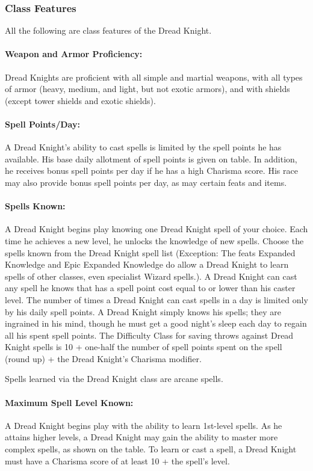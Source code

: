 \subsubsection{Class Features}
All the following are class features of the Dread Knight.

\paragraph{Weapon and Armor Proficiency:} 
Dread Knights are proficient with all simple and martial weapons, 
with all types of armor (heavy, medium, and light, but not exotic armors),
and with shields (except tower shields and exotic shields).

\paragraph{Spell Points/Day:} A Dread Knight's ability to cast spells is limited by the spell points he has available. 
His base daily allotment of spell points is given on  table. 
In addition, he receives bonus spell points per day if he has a high Charisma score.
His race may also provide bonus spell points per day, as may certain feats and items.

\paragraph{Spells Known:} A Dread Knight begins play knowing one Dread Knight spell of your choice. 
Each time he achieves a new level, he unlocks the knowledge of new spells.
Choose the spells known from the Dread Knight spell list
(Exception: The feats Expanded Knowledge and Epic Expanded Knowledge do allow a Dread Knight to learn spells of other classes, even specialist Wizard spells.).
A Dread Knight can cast any spell he knows that has a spell point cost equal to or lower than his caster level.
The number of times a Dread Knight can cast spells in a day is limited only by his daily spell points. 
A Dread Knight simply knows his spells; they are ingrained in his mind, though he must get a good night's sleep each day to regain all his spent spell points.
The Difficulty Class for saving throws against Dread Knight spells is 10 + one-half the number of spell points spent on the spell (round up) + the Dread Knight's Charisma modifier. 

Spells learned via the Dread Knight class are arcane spells.
\paragraph{Maximum Spell Level Known:} A Dread Knight begins play with the ability to learn 1st-level spells. 
As he attains higher levels, a Dread Knight may gain the ability to master more complex spells, as shown on the  table.
To learn or cast a spell, a Dread Knight must have a Charisma score of at least 10 + the spell's level.

